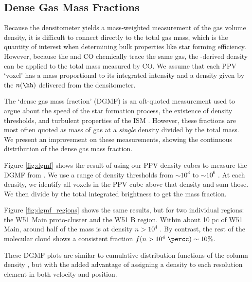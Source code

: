 \subsection{Dense Gas Mass Fractions}
Because the \formaldehyde densitometer yields a mass-weighted measurement of
the gas volume density, it is difficult to connect directly to the total gas
mass, which is the quantity of interest when determining bulk properties like
star forming efficiency.  However, because the \formaldehyde and CO chemically
trace the same gas, the \formaldehyde-derived density can be applied to the
total mass measured by CO.  We assume that each \thirteenco PPV `voxel' has a
mass proportional to its integrated intensity and a density given by the
$n(\hh)$ delivered from the \formaldehyde densitometer.

The `dense gas mass fraction' (DGMF) is an oft-quoted measurement used to argue
about the speed of the star formation process, the existence of density
thresholds, and turbulent properties of the ISM \citep[e.g. Fig. 5
of][]{Krumholz2007a,Battisti2014a,Kainulainen2013a,Juneau2009a,Muraoka2009a,Hopkins2013e}.
However, these fractions are most often quoted as mass of gas at a \emph{single}
density divided by the total mass.  We present an improvement on these measurements,
showing the continuous distribution of the dense gas mass fraction.

Figure \ref{fig:dgmf} shows the result of using our \formaldehyde PPV density
cubes to measure the DGMF from \thirteenco.  We use a range of density
thresholds from $\sim10^3$ to $\sim10^6$ \percc.  At each density, we identify
all voxels in the \thirteenco PPV cube above that density and sum those.  We
then divide by the total integrated \thirteenco brightness to get the mass
fraction. 

Figure \ref{fig:dgmf_regions} shows the same results, but for two individual
regions: the W51 Main proto-cluster and the W51 B region.  Within about 10 pc
of W51 Main, around half of the mass is at density $n>10^4$ \percc.  By
contrast, the rest of the molecular cloud shows a consistent fraction
$f(n>10^4~\percc) \sim10\%$.

These DGMF plots are similar to cumulative distribution functions of the column
density \citep[e.g.][Figure 6]{Battersby2014a}, but with the added advantage of
assigning a density to each resolution element in both velocity and position.

